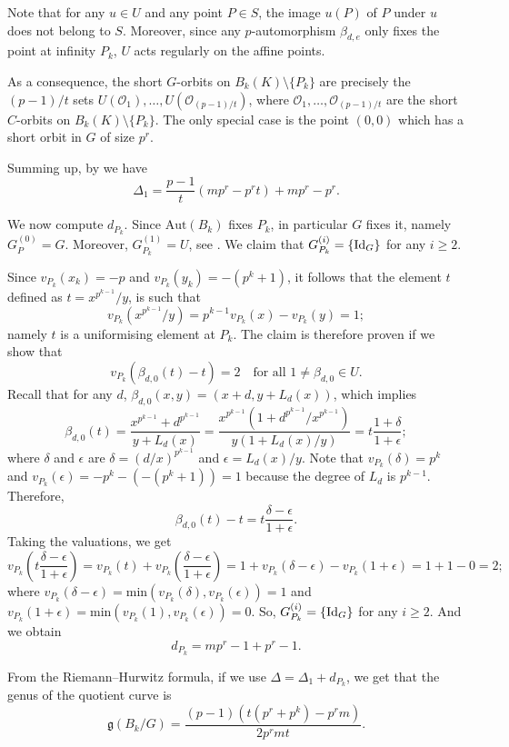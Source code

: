 \documentclass[oneside,a4paper,12pt]{article}
\theoremstyle{plain} %
\theoremstyle{definition} %
\newcommand{\Aut}{\mathrm{Aut}}
\begin{document}
Note that for any $u\in U$ and any point $P\in S$, the image $u(P)$ of $P$ under $u$ does not belong to $S$.
Moreover, since any $p$-automorphism $\beta_{d,e}$ only fixes the point at infinity $P_{k}$, $U$ acts regularly on the affine points.

As a consequence, the short $G$-orbits on $B_k(K)\setminus \{P_{k}\}$ are precisely the $(p-1)/t$ sets $U(\mathcal{O}_1),\dots, U(\mathcal{O}_{(p-1)/t})$, where $\mathcal{O}_1,\dots, \mathcal{O}_{(p-1)/t}$ are the short $C$-orbits on $B_k(K)\setminus \{P_{k}\}$. The only special case is the point $(0,0)$ which has a short orbit in $G$ of size $p^r$.

Summing up,  by \cite[Theorem 11.57]{HKT} we have
\[
\Delta_1=\frac{p-1}{t}(mp^r-p^rt)+mp^r-p^r. 
\]



We now compute $d_{P_k}$.
Since $\Aut(B_k)$ fixes $P_{k}$, in particular $G$ fixes it, namely $G_P^{(0)}=G$. Moreover, $G_{P_{k}}^{(1)}=U$, see \cite[Theorem 11.64]{HKT}. We claim that  $G_{P_{k}}^{(i)}=\{\textup{Id}_G\}$ for any $i\geq 2$.

Since  $v_{P_{k}}(x_k)=-p$ and $v_{P_{k}}(y_k)=-(p^{k}+1)$, it follows that the element $t$ defined as $t=x^{p^{k-1}}/y$, is such that
\[
v_{P_k}(x^{p^{k-1}}/y)= p^{k-1}v_{P_k}(x)-v_{P_k}(y)=1;
\]
namely $t$ is a uniformising element at $P_{k}$.
The claim is therefore proven if we show that
\[
v_{P_k}(\beta_{d,0}(t)-t)=2\quad\text{for all }1\neq\beta_{d,0}\in U.
\]
Recall that for any $d$, $\beta_{d,0}(x,y)=(x+d,y+L_d(x))$, which implies 
\[
\beta_{d,0}(t)=\frac{x^{p^{k-1}}+d^{p^{k-1}}}{y+L_d(x)}=\frac{x^{p^{k-1}}(1+d^{p^{k-1}}/x^{p^{k-1}})}{y(1+L_d(x)/y)}=t\frac{1+\delta}{1+\epsilon};
\]
where $\delta$ and $\epsilon$ are $\delta = (d/x)^{p^{k-1}}$ and $\epsilon = L_d(x)/y$.
Note that $v_{P_{k}}(\delta)=p^k$ and $v_{P_{k}}(\epsilon)=-p^k-(-(p^k+1))=1$ because the degree of $L_d$ is $p^{k-1}$.
Therefore,
\[
\beta_{d,0}(t)-t=t\frac{\delta-\epsilon}{1+\epsilon}.
\]
Taking the valuations, we get
\[
v_{P_{k}}\left(t\frac{\delta-\epsilon}{1+\epsilon}\right)=v_{P_{k}}(t)+v_{P_{k}}\left(\frac{\delta-\epsilon}{1+\epsilon}\right)=1+v_{P_{k}}(\delta-\epsilon)-v_{P_{k}}(1+\epsilon)=1+1-0=2;
\]
where
$v_{P_{k}}(\delta-\epsilon)=\mathrm{min}(v_{P_{k}}(\delta),v_{P_{k}}(\epsilon))=1$ and 
$v_{P_{k}}(1+\epsilon)=\mathrm{min}(v_{P_{k}}(1),v_{P_{k}}(\epsilon))=0$.
So, $G_{P_{k}}^{(i)}=\{\textup{Id}_G\}$ for any $i\geq 2$.
And we obtain
$$d_{P_k}=mp^r-1+p^r-1.$$

From the  Riemann--Hurwitz formula, if we use $\Delta=\Delta_1+d_{P_{k}}$, we get that the genus of the quotient curve is
\begin{equation}\label{eq: genus quotient}
    \mathfrak{g}(B_k/G) = \frac{(p-1)(t(p^r+p^k)-p^rm)}{2p^rmt}.
\end{equation}
\end{document}
